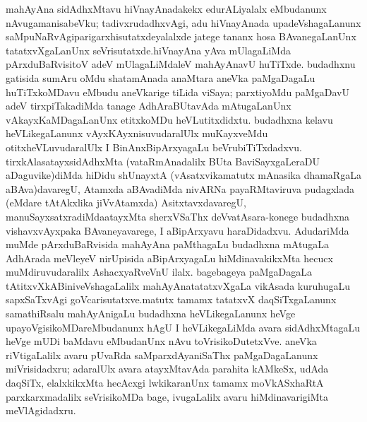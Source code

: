 mahAyAna sidAdhxMtavu hiVnayAnadakekx edurALiyalalx eMbudanunx nAvu\break gamanisabeVku; tadivxrudadhxvAgi, adu hiVnayAnada upadeVshagaLanunx saMpuNaRvAgi\break parigarxhisutatxdeyalalxde jatege tananx hosa BAvanegaLanUnx tatatxvXgaLanUnx seVrisutatxde.\break hiVnayAna yAva mUlagaLiMda pArxduBaRvisitoV adeV mUlagaLiMdaleV mahA\-yAnavU huTiTxde. budadhxnu gatisida sumAru oMdu shatamAnada anaMtara aneVka paMga\-DagaLu huTiTxkoMDavu eMbudu aneVkarige tiLida viSaya; parxtiyoMdu paMga\-DavU adeV tirxpiTakadiMda tanage AdhAraBUtavAda mAtugaLanUnx vAkayxKaMDa\-gaLanUnx  etitxkoMDu heVLutitxdidxtu. budadhxna kelavu heVLikegaLanunx vAyxKAyxnisuvudaralUlx muKayx\-veMdu otitxheVLuvudaralUlx I BinAnxBipArxyagaLu beVrubiTiTxdadxvu. tirxkAlasatayxsidAdhxMta (vataRmAnadalilx BUta BaviSayxgaLeraDU aDaguvike)diMda hiDidu shUnayxtA (vAsatxvika\break matutx mAnasika dhamaRgaLa aBAva)davaregU, Atamxda aBAvadiMda nivARNa payaRMta\-viruva pudagxlada (eMdare tAtAkxlika jiVvAtamxda) AsitxtavxdavaregU, manuSayxsatxradiMda\break atayxMta sherxVSaThx deVvatAsara-konege budadhxna vishavxvAyxpaka BAvaneyavarege, I aBi\break\-pArxyavu haraDidadxvu. AdudariMda muMde pArxduBaRvisida mahAyAna paMthagaLu budadhxna mAtugaLa AdhArada meVleyeV nirUpisida aBipArxyagaLu hiMdinavakikxMta hecucx muMdiruvudaralilx AshacxyaR\-veVnU ilalx. bagebageya paMgaDagaLa tAtitxvXkABi\break\-niveVshagaLalilx mahAyAnatatatxvXgaLa vikAsada kuruhugaLu sapxSaTxvAgi goVcarisutatxve.\break matutx tamamx tatatxvX daqSiTx\-gaLanunx samathiRsalu mahAyAnigaLu budadhxna heVLikegaLanunx heVge upayoVgisikoMDareMbudanunx hAgU I heVLikegaLiMda avara sidAdhxMta\-gaLu heVge mUDi baMdavu eMbudanUnx nAvu toVrisi\-koDu\-tetxVve. aneVka riVtigaLalilx avaru pUvaRda saMparxdAyaniSaThx paMgaDagaLanunx miVrisidadxru; adaralUlx avara atayxMta\-vAda parahita kAMkeSx, udAda daqSiTx, elalxkikxMta hecAcxgi lwkikaranUnx tamamx moVkASx\-haRtA parxkarxmadalilx seVrisikoMDa bage, ivugaLalilx avaru hiMdinava\-rigiMta meVlAgi\-dadxru.

